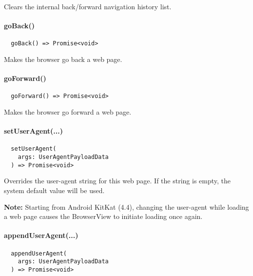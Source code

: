 Clears the internal back/forward navigation history list.



\paragraph{goBack()}

\begin{verbatim}
  goBack() => Promise<void>
\end{verbatim}

Makes the browser go back a web page.



\paragraph{goForward()}

\begin{verbatim}
  goForward() => Promise<void>
\end{verbatim}

Makes the browser go forward a web page.



\paragraph{setUserAgent(...)}

\begin{verbatim}
  setUserAgent(
    args: UserAgentPayloadData
  ) => Promise<void>
\end{verbatim}

Overrides the user-agent string for this web page.
If the string is empty, the system default value will be used.

\textbf{Note:} Starting from Android KitKat (4.4), changing the user-agent while
loading a web page causes the BrowserView to initiate loading once again.~\cite{android:api}



\paragraph{appendUserAgent(...)}

\begin{verbatim}
  appendUserAgent(
    args: UserAgentPayloadData
  ) => Promise<void>
\end{verbatim}

